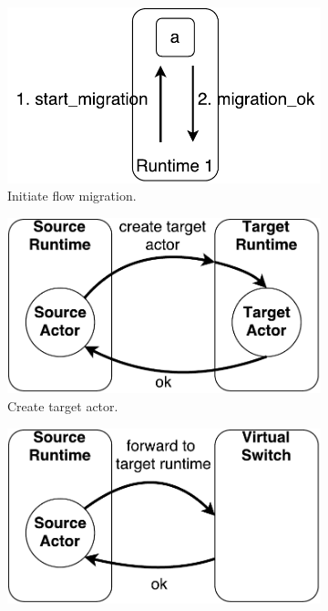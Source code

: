 \begin{figure}[!t]
	\begin{subfigure}[t]{0.23\linewidth}
		\centering
		\includegraphics[width=\columnwidth]{figure/NFActor-Flow-Migration-Init.pdf}
		\caption{Initiate flow migration.}\label{fig:init} 
	\end{subfigure}\hfill
	\begin{subfigure}[t]{0.23\linewidth}
		\centering
		\includegraphics[width=\columnwidth]{figure/NFActor-Flow-Migration-First.pdf}
		\caption{Create target actor.}\label{fig:first} \end{subfigure}\hfill
	\begin{subfigure}[t]{0.23\linewidth}
		\centering
		\includegraphics[width=\columnwidth]{figure/NFActor-Flow-Migration-Second.pdf}

\end{subfigure}
\end{figure}
